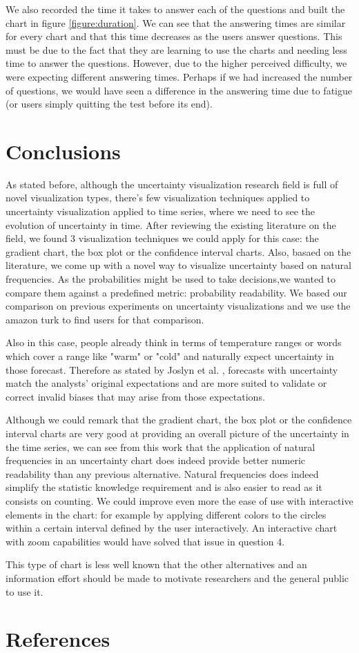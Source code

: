 \documentclass[a4paper,3p,sort&compress]{elsarticle}
\begin{document}
We also recorded the time it takes to answer each of the questions and built the chart in figure \ref{figure:duration}. We 
can see that the answering times are similar for every chart and that this time decreases as the users answer questions.
This must be due to the fact that they are learning to use the charts and needing less time to answer the questions.
However, due to the higher perceived difficulty, we were expecting different answering times. Perhaps if we had 
increased the number of questions, we would have seen a difference in the answering time due to fatigue (or users simply quitting the test 
before its end).


\section{Conclusions}
\label{sec:concl}

As stated before, although the uncertainty visualization research field is full of novel visualization types, there's few 
visualization techniques applied to uncertainty visualization applied to time series, where we need to see the evolution of uncertainty 
in time. After reviewing the existing literature on the field, we found 3 visualization techniques we could apply for this case:
the gradient chart, the box plot or the confidence interval charts. Also, basaed on the literature, we come up with a 
novel way to visualize uncertainty based on natural frequencies.
As the probabilities might be used to take decisions,we wanted to compare them against a predefined metric: probability readability.
We based our comparison on previous experiments on uncertainty visualizations and we use the amazon turk to find 
users for that comparison.

Also in this case, people already think in terms of temperature ranges or words which cover a range like "warm" or "cold" and naturally
expect uncertainty in those forecast. Therefore as stated by Joslyn et al.
\cite{joslyn_communicating_2010} , 
forecasts with uncertainty match the analysts' original expectations and are more suited to 
validate or correct invalid biases that may arise from those expectations.

Although we could remark that the gradient chart, the box plot or the confidence interval charts are very good at 
providing an overall picture of the uncertainty in the time series, we can see from this work that the application of natural 
frequencies in an uncertainty chart does indeed
provide better numeric readability than any previous alternative. Natural frequencies does indeed simplify 
the statistic knowledge requirement and is also easier to read as it consists on counting.
We could improve even more the ease of use with interactive elements in the chart: for example
by applying different colors to the circles within a certain interval defined by the user interactively.
An interactive chart with zoom capabilities would have solved that 
issue in question 4.

This type of chart is less well known that the other alternatives and an information effort should be made to motivate 
researchers and the general public to use it.

\section{References}
\label{sec:ref}



\end{document}
